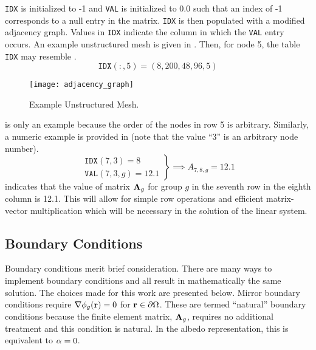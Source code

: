     \texttt{IDX} is initialized to -1 and \texttt{VAL} is initialized 
    to 0.0 such that an index of -1 corresponds to a null entry in the 
    matrix. \texttt{IDX} is then populated with a modified adjacency graph. 
    Values in \texttt{IDX} indicate the column in which the \texttt{VAL} entry
    occurs. An example unstructured mesh is given in . 
    Then, for node 5, the table \texttt{IDX} may resemble .
    \begin{equation}
      \label{eq:idx_example}
      \texttt{IDX}(:,5) = (8, 200, 48, 96, 5 )
    \end{equation}

    \begin{figure}
      \centering
      \texttt{[image: adjacency\_graph]}
      \caption{Example Unstructured Mesh.}
      \label{fig:adjacency_graph}
    \end{figure}

     is only an example because the order of the nodes in 
    row 5 is arbitrary. Similarly, a numeric example is provided in 
     (note that the value ``3'' is an arbitrary node 
    number).
    \begin{equation}
      \label{eq:idx_number}
      \left.
      \begin{array}{c}
        \texttt{IDX}(7,3) = 8 \\
        \texttt{VAL}(7,3,g) = 12.1
      \end{array}
      \right\}
      \implies
      A_{7,8,g} = 12.1
    \end{equation}
     indicates that the value of matrix $\mathbf{A}_g$ for group
    $g$ in the seventh row in the eighth column is 12.1. This will allow for 
    simple row operations and efficient matrix-vector multiplication which will
    be necessary in the solution of the linear system.

  \subsection{Boundary Conditions}
    \label{sec:boundary_conditions}
    Boundary conditions merit brief consideration. There are many ways to 
    implement boundary conditions and all result in mathematically the same 
    solution. The choices made for this work are presented below. Mirror 
    boundary conditions require $\mathbf{\nabla} \phi_g(\mathbf{r}) = 0$ for 
    $\mathbf{r} \in \partial \Omega$. These are termed ``natural'' boundary
    conditions because the finite element matrix, $\mathbf{A}_g$, requires no
    additional treatment and this condition is natural. In the albedo
    representation, this is equivalent to $\alpha = 0$.
    
